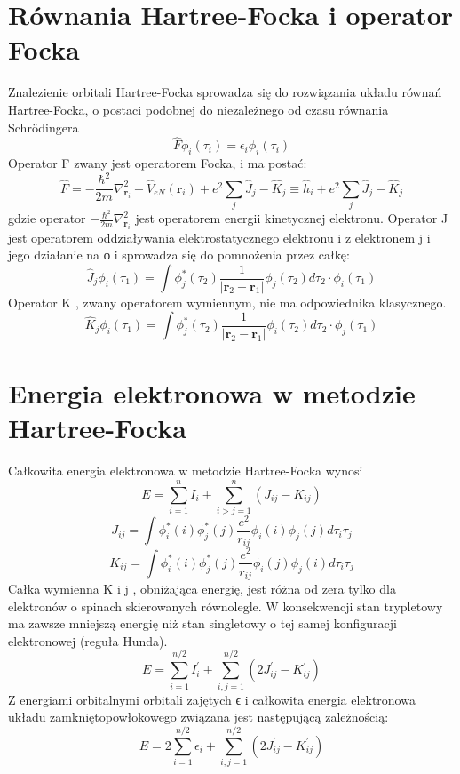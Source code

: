 \documentclass{article}
\begin{document}
\section{Równania Hartree-Focka i operator Focka}
Znalezienie orbitali Hartree-Focka sprowadza się do rozwiązania układu równań Hartree-Focka, o postaci podobnej do niezależnego od czasu równania Schrödingera
$$ { {\hat {F}}\phi _{i}(\tau _{i})=\epsilon _{i}\phi _{i}(\tau _{i})} $$
Operator F zwany jest operatorem Focka, i ma postać:
$$ { {\hat {F}}=-{\frac {\hbar ^{2}}{2m}}\nabla _{\mathbf {r} _{i}}^{2}+{\hat {V}}_{eN}(\mathbf {r} _{i})+e^{2}\sum \limits _{j}{\hat {J}}_{j}-{\hat {K}}_{j}\equiv {\hat {h}}_{i}+e^{2}\sum \limits _{j}{\hat {J}}_{j}-{\hat {K}}_{j}} $$
gdzie operator $ { -{\frac {\hbar ^{2}}{2m}}\nabla _{\mathbf {r} _{i}}^{2}}$   jest operatorem energii kinetycznej elektronu.
Operator J  jest operatorem oddziaływania elektrostatycznego elektronu i z elektronem j i jego działanie na ϕ i sprowadza się do pomnożenia przez całkę:
$$ { {\hat {J}}_{j}\phi _{i}(\tau _{1})=\int \phi _{j}^{*}(\tau _{2}){\frac {1}{\vert \mathbf {r} _{2}-\mathbf {r} _{1}\vert }}\phi _{j}(\tau _{2})d\tau _{2}\cdot \phi _{i}(\tau _{1})} $$
Operator K ,  zwany operatorem wymiennym, nie ma odpowiednika klasycznego.
$$ { {\hat {K}}_{j}\phi _{i}(\tau _{1})=\int \phi _{j}^{*}(\tau _{2}){\frac {1}{\vert \mathbf {r} _{2}-\mathbf {r} _{1}\vert }}\phi _{i}(\tau _{2})d\tau _{2}\cdot \phi _{j}(\tau _{1})} $$

\section{Energia elektronowa w metodzie Hartree-Focka}
Całkowita energia elektronowa w metodzie Hartree-Focka wynosi 
$${ E=\sum _{i=1}^{n}I_{i}+\sum _{i>j=1}^{n}\left(J_{ij}-K_{ij}\right)}$$
$${ J_{ij}=\int \phi _{i}^{*}(i)\phi _{j}^{*}(j){\frac {e^{2}}{r_{ij}}}\phi _{i}(i)\phi _{j}(j)d\tau _{i}\tau _{j}}$$
$${ K_{ij}=\int \phi _{i}^{*}(i)\phi _{j}^{*}(j){\frac {e^{2}}{r_{ij}}}\phi _{i}(j)\phi _{j}(i)d\tau _{i}\tau _{j}}$$
Całka wymienna K i j ,  obniżająca energię, jest różna od zera tylko dla elektronów o spinach skierowanych równolegle. W konsekwencji stan trypletowy ma zawsze mniejszą energię niż stan singletowy o tej samej konfiguracji elektronowej (reguła Hunda). 
$${ E=\sum _{i=1}^{n/2}I_{i}^{'}+\sum _{i,j=1}^{n/2}\left(2J_{ij}^{'}-K_{ij}^{'}\right)}$$
Z energiami orbitalnymi orbitali zajętych ϵ i całkowita energia elektronowa układu zamkniętopowłokowego związana jest następującą zależnością: 
$${ E=2\sum _{i=1}^{n/2}\epsilon _{i}+\sum _{i,j=1}^{n/2}\left(2J_{ij}^{'}-K_{ij}^{'}\right)}$$
\end{document}
